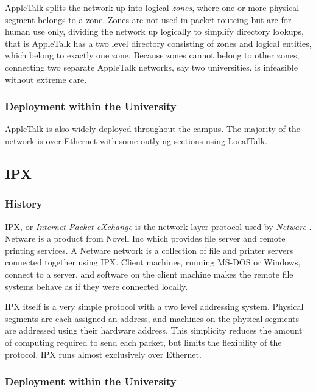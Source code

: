AppleTalk splits the network up into logical {\em zones}, where one or
more physical segment belongs to a zone.  Zones are not used in packet
routeing but are for human use only, dividing the network up logically
to simplify directory lookups, that is AppleTalk has a two level
directory consisting of zones and logical entities, which belong to
exactly one zone.  Because zones cannot belong to other zones,
connecting two separate AppleTalk networks, say two universities, is
infeasible without extreme care.

\subsubsection{Deployment within the University}

AppleTalk is also widely deployed throughout the campus.  The majority
of the network is over Ethernet with some outlying sections using
LocalTalk.

\subsection{IPX}
\label{network:ipx}

\subsubsection{History}

IPX, or {\em Internet Packet eXchange} is the network layer protocol
used by {\em Netware} \cite{Novell:IPX}.  Netware is a product from
Novell Inc which provides file server and remote printing services.  A
Netware network is a collection of file and printer servers connected
together using IPX.  Client machines, running MS-DOS or Windows,
connect to a server, and software on the client machine makes the
remote file systems behave as if they were connected locally.

IPX itself is a very simple protocol with a two level addressing
system.  Physical segments are each assigned an address, and machines
on the physical segments are addressed using their hardware address.
This simplicity reduces the amount of computing required to send each
packet, but limits the flexibility of the protocol.  IPX runs almost
exclusively over Ethernet.

\subsubsection{Deployment within the University}

